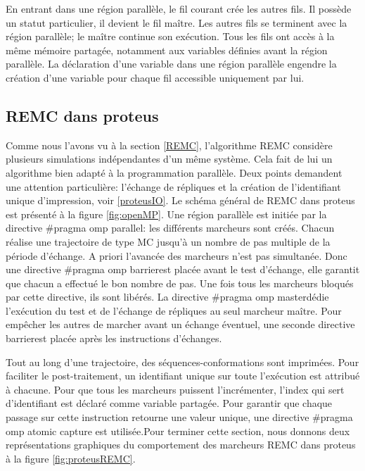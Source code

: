 En entrant dans une région parallèle, le fil courant crée les autres fils. Il possède un statut particulier, il devient le fil maître. Les autres fils se terminent avec la région parallèle; le maître continue son exécution. Tous les fils ont accès à la même mémoire partagée, notamment aux variables définies avant la région parallèle. La déclaration d'une variable dans une région parallèle engendre la création d'une variable pour chaque fil accessible uniquement par lui. 
   

\subsection{REMC dans proteus}

Comme nous l'avons vu à la section \vref{REMC}, l'algorithme REMC considère plusieurs simulations indépendantes d'un même système. Cela fait de lui un algorithme bien adapté à la programmation parallèle. Deux points demandent une attention particulière: l'échange de répliques et la création de l'identifiant unique d'impression, voir \ref{proteusIO}. Le schéma général de REMC dans proteus est présenté à la figure \ref{fig:openMP}. Une région parallèle est initiée par la directive \og #pragma omp parallel\fg: les différents marcheurs sont créés. Chacun réalise une trajectoire de type MC jusqu'à un nombre de pas multiple de la période d'échange. A priori l'avancée des marcheurs n'est pas simultanée. Donc une directive \og #pragma omp barrier\fg est placée avant le test d'échange, elle garantit que chacun a effectué le bon nombre de pas. Une fois tous les marcheurs bloqués par cette directive, ils sont libérés. La directive \og #pragma omp master\fg dédie l'exécution du test et de l'échange de répliques au seul marcheur maître. Pour empêcher les autres de marcher avant un échange éventuel, une seconde directive \og barrier\fg est placée après les instructions d'échanges.

Tout au long d'une trajectoire, des séquences-conformations sont imprimées. Pour faciliter le post-traitement, un identifiant unique sur toute l'exécution est attribué à chacune. Pour que tous les marcheurs puissent l'incrémenter, l'index qui sert d'identifiant est déclaré comme variable partagée. Pour garantir que chaque passage sur cette instruction retourne une valeur unique, une directive \og#pragma omp atomic capture \fg est utilisée.Pour terminer cette section, nous donnons deux représentations graphiques du comportement des marcheurs REMC dans proteus à la figure \ref{fig:proteusREMC}.  

